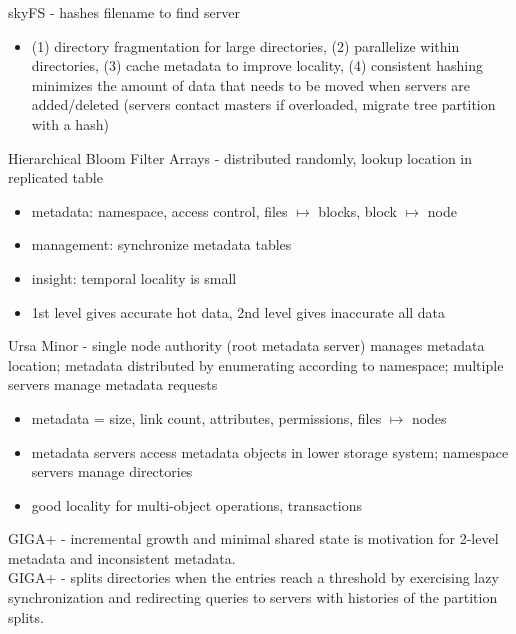 \documentclass{article}
\begin{document}
\noindent\cite{xing:sc2009-skyfs} skyFS - hashes filename to find server
\begin{itemize}
	\item (1) directory fragmentation for large directories, (2) parallelize within directories, (3) cache metadata to improve locality, (4) consistent hashing minimizes the amount of data that needs to be moved when servers are added/deleted (servers contact masters if overloaded, migrate tree partition with a hash)
\end{itemize}

\noindent\cite{zhu:pds2008-hba} Hierarchical Bloom Filter Arrays - distributed randomly, lookup location in replicated table
\begin{itemize}
	\item metadata: namespace, access control, files \(\mapsto\) blocks, block \(\mapsto\) node
	\item management: synchronize metadata tables
	\item insight: temporal locality is small
	\item 1st level gives accurate hot data, 2nd level gives inaccurate all data
\end{itemize}



\noindent\cite{sinnamohideen:atc2010-ursa} Ursa Minor - single node authority (root metadata server) manages metadata location; metadata distributed by enumerating according to namespace; multiple servers manage metadata requests
\begin{itemize}
	\item metadata = size, link count, attributes, permissions, files \(\mapsto\) nodes
	\item metadata servers access metadata objects in lower storage system; namespace servers manage directories
	\item good locality for multi-object operations, transactions
\end{itemize}

\noindent\cite{patil:pdsw2007-giga+} GIGA+ - incremental growth and minimal shared state is motivation for 2-level metadata and inconsistent metadata.\\

\noindent\cite{patil:fast2011-giga+} GIGA+ - splits directories when the entries reach a threshold by exercising lazy synchronization and redirecting queries to servers with histories of the partition splits.\\
\end{document}

